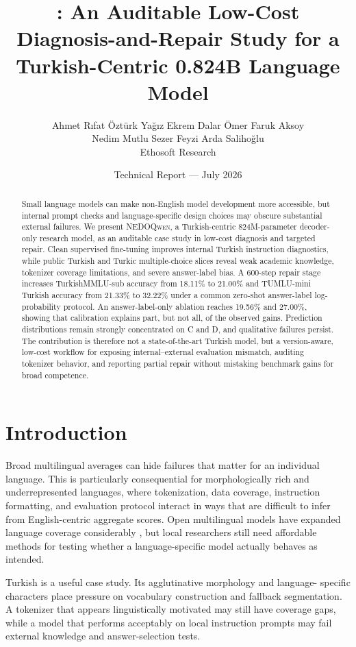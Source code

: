 \documentclass[11pt]{article}
\title{\model: An Auditable Low-Cost\\
Diagnosis-and-Repair Study for a\\
Turkish-Centric 0.824B Language Model}
\author{Ahmet R{\i}fat \"Ozt\"urk \quad Ya\u{g}{\i}z Ekrem Dalar \quad
\"Omer Faruk Aksoy\\
Nedim Mutlu Sezer \quad Feyzi Arda Saliho\u{g}lu\\
\small Ethosoft Research}
\date{Technical Report --- July 2026}
\newcommand{\model}{\textsc{NEDOQwen}}
\newcommand{\tmmlu}{TurkishMMLU-sub}
\newcommand{\tumlu}{TUMLU-mini Turkish}
\begin{document}
\maketitle

\begin{abstract}
Small language models can make non-English model development more accessible,
but internal prompt checks and language-specific design choices may obscure
substantial external failures. We present \model, a Turkish-centric
824M-parameter decoder-only research model, as an auditable case study in
low-cost diagnosis and targeted repair. Clean supervised fine-tuning improves
internal Turkish instruction diagnostics, while public Turkish and Turkic
multiple-choice slices reveal weak academic knowledge, tokenizer coverage
limitations, and severe answer-label bias. A 600-step repair stage increases
\tmmlu{} accuracy from 18.11\% to 21.00\% and \tumlu{} accuracy from 21.33\%
to 32.22\% under a common zero-shot answer-label log-probability protocol. An
answer-label-only ablation reaches 19.56\% and 27.00\%, showing that calibration
explains part, but not all, of the observed gains. Prediction distributions
remain strongly concentrated on C and D, and qualitative failures persist.
The contribution is therefore not a state-of-the-art Turkish model, but a
version-aware, low-cost workflow for exposing internal--external evaluation
mismatch, auditing tokenizer behavior, and reporting partial repair without
mistaking benchmark gains for broad competence.
\end{abstract}

\section{Introduction}

Broad multilingual averages can hide failures that matter for an individual
language. This is particularly consequential for morphologically rich and
underrepresented languages, where tokenization, data coverage, instruction
formatting, and evaluation protocol interact in ways that are difficult to
infer from English-centric aggregate scores. Open multilingual models have
expanded language coverage considerably \citep{conneau2020xlmr,scao2022bloom,
yang2024qwen25}, but local researchers still need affordable methods for
testing whether a language-specific model actually behaves as intended.

Turkish is a useful case study. Its agglutinative morphology and language-
specific characters place pressure on vocabulary construction and fallback
segmentation. A tokenizer that appears linguistically motivated may still have
coverage gaps, while a model that performs acceptably on local instruction
prompts may fail external knowledge and answer-selection tests.
\end{document}
